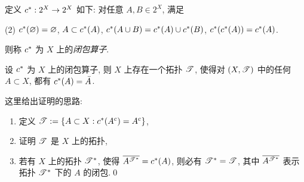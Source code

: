     \begin{Definition}
        定义 $ c^{*}:2^{X}\to 2^{X} $ 如下: 对任意 $ A, B\in 2^{X} $, 满足
        \begin{lpbn}(2)
            \task $ c^{*}(\varnothing)=\varnothing $,
            \task $ A\subset c^{*}(A) $,
            \task $ c^{*}(A\cup B)=c^{*}(A)\cup c^{*}(B) $,
            \task $ c^{*}(c^{*}(A))=c^{*}(A) $.
        \end{lpbn}
        则称 $ c^{*} $ 为 $ X $ 上的\emph{闭包算子}.
    \end{Definition}

    \begin{Theorem}
        设 $ c^{*} $ 为 $ X $ 上的闭包算子, 则 $ X $ 上存在一个拓扑 $ \mathscr{T} $, 使得对 $ (X, \mathscr{T}) $ 中的任何 $ A\subset X $, 都有 $ c^{*}(A)=\bar{A} $.
    \end{Theorem}
    \begin{Proof}
        这里给出证明的思路:
        \begin{enumerate}
            \item 定义 $ \mathscr{T}:=\left\{ A\subset X: c^{*}(A^{c})=A^{c} \right\} $,
            \item 证明 $ \mathscr{T} $ 是 $ X $ 上的拓扑, 
            \item 若有 $ X $ 上的拓扑 $ \mathscr{T}^{*} $, 使得 $ \overline{A^{\mathscr{T}^{*}}}=c^{*}(A) $, 则必有 $ \mathscr{T}^{*}=\mathscr{T} $, 其中 $ \overline{A^{\mathscr{T}^{*}}} $ 表示拓扑 $ \mathscr{T}^{*} $ 下的 $ A $ 的闭包.\qed
        \end{enumerate}
    \end{Proof}

